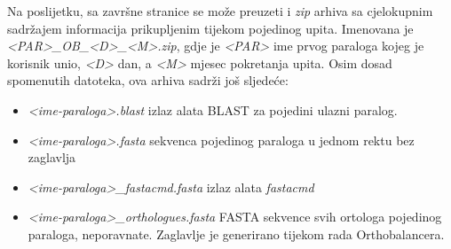 \begin{sloppypar}

Na poslijetku, sa završne stranice se može preuzeti i \emph{zip} arhiva sa
cjelokupnim sadržajem informacija prikupljenim tijekom pojedinog upita.
Imenovana je \emph{<PAR>\_OB\_<D>\_<M>.zip}, gdje je \emph{<PAR>}
ime prvog paraloga kojeg je korisnik unio, \emph{<D>} dan, a \emph{<M>}
mjesec pokretanja upita. Osim dosad spomenutih datoteka, ova arhiva sadrži još
sljedeće:

\end{sloppypar}

\begin{itemize}

    \item \emph{<ime-paraloga>.blast} izlaz alata BLAST za pojedini ulazni
paralog.

    \item \emph{<ime-paraloga>.fasta} sekvenca pojedinog paraloga u jednom
rektu bez zaglavlja

    \item \emph{<ime-paraloga>\_fastacmd.fasta} izlaz alata \emph{fastacmd}

    \item \emph{<ime-paraloga>\_orthologues.fasta} FASTA sekvence svih ortologa
pojedinog paraloga, neporavnate. Zaglavlje je generirano tijekom rada
Orthobalancera.

\end{itemize}
